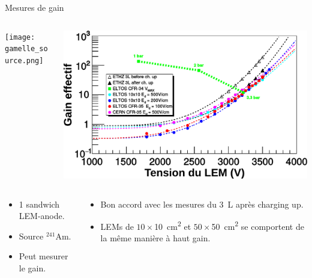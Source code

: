     \begin{frame}{Mesures de gain}
    	\begin{scriptsize}
    		\begin{columns}
    			\begin{column}{0.46\textwidth}
    				\centering \texttt{[image: gamelle\_source.png]}
    			\end{column}\hfill
    			\begin{column}{0.58\textwidth}
    				\centering \includegraphics[width=\textwidth]{./pictures/New_LEM_Gain.pdf}
    			\end{column}
    		\end{columns}\vfill
    		\begin{columns}
    			\begin{column}{0.38\textwidth}
    				\begin{itemize}
    					\item 1 sandwich LEM-anode.
    					\item Source $^{241}$Am.
    					\item Peut mesurer le gain.
    				\end{itemize}
    			\end{column}\hfill
    			\begin{column}{0.58\textwidth}
    				\begin{itemize}
        				\item Bon accord avec les mesures du \SI{3}{\liter} après charging up.
    					\item LEMs de $10\times$\SI{10}{\centi\meter\squared} et $50\times$\SI{50}{\centi\meter\squared} se comportent de la même manière à haut gain.

\end{itemize}
\end{column}
\end{columns}
\end{scriptsize}
\end{frame}
